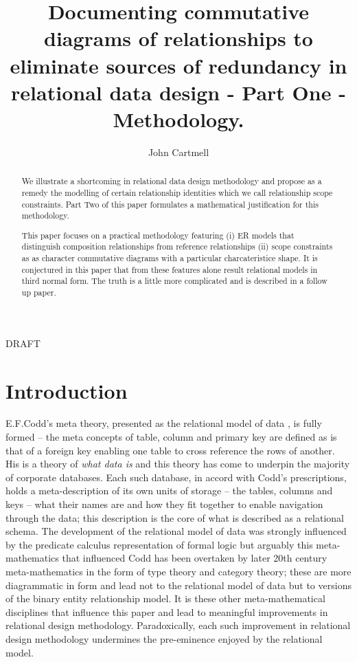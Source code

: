 \documentclass[10pt,a4paper]{article}
\begin{document}
\title{Documenting commutative diagrams of relationships to eliminate sources of redundancy in relational data design - Part One - Methodology.}


\author{John Cartmell}

\maketitle
\begin{center}
DRAFT
\end{center}

\begin{abstract}
\noindent We illustrate a shortcoming in relational data design methodology and propose 
as a remedy the modelling
of certain relationship identities which we call relationship scope constraints.  
Part Two of this paper formulates a mathematical justification for this methodology.

This paper focuses on a practical methodology featuring (i) ER models that distinguish composition relationships from reference relationships (ii) scope constraints as as character commutative diagrams with a particular charcateristice shape. It is conjectured in this paper that from these features alone result
relational models in third normal form. The truth is a little more complicated and is described in a follow up paper.
\end{abstract}

% 
\section{Introduction}

E.F.Codd's meta theory, presented as the relational model of data \cite{Codd1970}, is fully formed -- the meta concepts of table, column and primary key are defined as is that of a foreign key enabling one table to cross reference the rows of another. 
His is a theory of \textit{what data is} and this theory has come to underpin the majority of corporate databases.  
Each such database, in accord with Codd's prescriptions, holds a meta-description of its own units of storage -- the tables, columns and keys -- what their names are and how they fit together to enable navigation through the data; this description is the core of what is described as a relational schema. The development of the relational model of data was strongly influenced by the predicate calculus representation of formal logic but arguably 
this meta-mathematics that influenced Codd has been overtaken by  later 20th century meta-mathematics in the form of type theory and category theory; these are more diagrammatic in form and lead not to the relational model of data but to versions of the binary entity relationship model. It is these other meta-mathematical disciplines that influence this paper and lead to meaningful improvements in relational design methodology. Paradoxically, each such improvement in relational design methodology undermines the pre-eminence enjoyed by the relational model.\\
\end{document}
